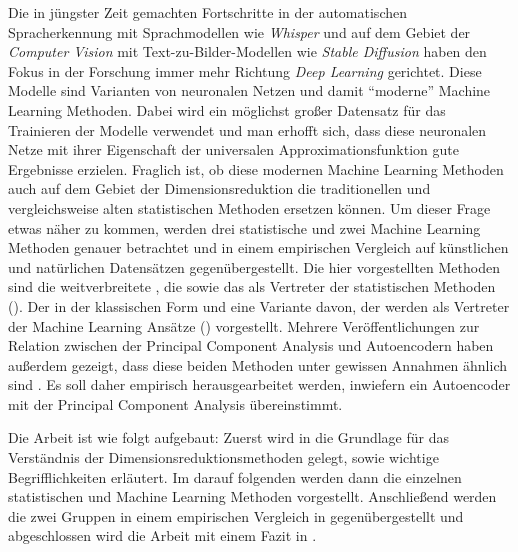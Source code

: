 Die in jüngster Zeit gemachten Fortschritte in der automatischen Spracherkennung mit Sprachmodellen
wie \textit{Whisper} \parencite{Radford.2022} und auf dem Gebiet der \textit{Computer Vision} mit Text-zu-Bilder-Modellen
wie \textit{Stable Diffusion} \parencite{Rombach.2021} haben den Fokus in der Forschung immer mehr Richtung \textit{Deep Learning}
gerichtet. Diese Modelle sind Varianten von neuronalen Netzen und damit \enquote{moderne} Machine
Learning Methoden. Dabei wird ein möglichst großer Datensatz für das Trainieren der Modelle
verwendet und man erhofft sich, dass diese neuronalen Netze mit ihrer Eigenschaft der universalen
Approximationsfunktion \parencites[194 -- 197]{Goodfellow.2016}{Hornik.1989} gute Ergebnisse erzielen. Fraglich ist, ob diese
modernen Machine Learning Methoden auch auf dem Gebiet der Dimensionsreduktion die traditionellen
und vergleichsweise alten statistischen Methoden ersetzen können. Um dieser Frage etwas näher zu
kommen, werden drei statistische und zwei Machine Learning Methoden genauer betrachtet und in einem
empirischen Vergleich auf künstlichen und natürlichen Datensätzen gegenübergestellt. Die hier
vorgestellten Methoden sind die weitverbreitete , die
 sowie das  als
Vertreter der statistischen Methoden (). Der
 in der klassischen Form und eine Variante davon, der  werden als Vertreter der Machine Learning Ansätze
() vorgestellt. Mehrere Veröffentlichungen zur Relation
zwischen der Principal Component Analysis und Autoencodern haben außerdem gezeigt, dass diese
beiden Methoden unter gewissen Annahmen ähnlich sind \parencites{Baldi.1989}{Bourlard.1988}{Plaut.2018}. Es soll daher empirisch herausgearbeitet werden,
inwiefern ein Autoencoder mit der Principal Component Analysis übereinstimmt.

Die Arbeit ist wie folgt aufgebaut: Zuerst wird in  die Grundlage
für das Verständnis der Dimensionsreduktionsmethoden gelegt, sowie wichtige Begrifflichkeiten
erläutert. Im darauf folgenden  werden dann die einzelnen
statistischen und Machine Learning Methoden vorgestellt. Anschließend werden die zwei Gruppen in
einem empirischen Vergleich in  gegenübergestellt und abgeschlossen wird die
Arbeit mit einem Fazit in .